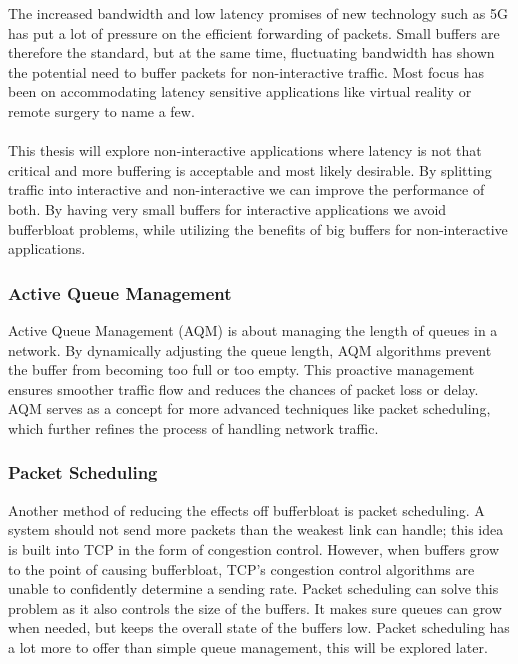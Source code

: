 \documentclass[a4paper,english, 11pt]{report}
\begin{document}
The increased bandwidth and low latency promises of new technology such as 5G has put a lot of pressure on the efficient forwarding of packets. Small buffers are therefore the standard, but at the same time, fluctuating bandwidth has shown the potential need to buffer packets for non-interactive traffic.
Most focus has been on accommodating latency sensitive applications like virtual reality or remote surgery to name a few.\\\\
This thesis will explore non-interactive applications where latency is not that critical and more buffering is acceptable and most likely desirable. By splitting traffic into interactive and non-interactive we can improve the performance of both. By having very small buffers for interactive applications we avoid bufferbloat problems, while utilizing the benefits of big buffers for non-interactive applications.\\

\subsubsection{Active Queue Management}
Active Queue Management (AQM) is about managing the length of queues in a network. By dynamically adjusting the queue length, AQM algorithms\cite{aqm_survey} prevent the buffer from becoming too full or too empty\cite{aqm}. This proactive management ensures smoother traffic flow and reduces the chances of packet loss or delay. AQM serves as a concept for more advanced techniques like packet scheduling, which further refines the process of handling network traffic.

\subsubsection{Packet Scheduling}
Another method of reducing the effects off bufferbloat is packet scheduling. A system should not send more packets than the weakest link can handle; this idea is built into TCP in the form of congestion control. However, when buffers grow to the point of causing bufferbloat, TCP's congestion control algorithms are unable to confidently determine a sending rate. Packet scheduling can solve this problem as it also controls the size of the buffers. It makes sure queues can grow when needed, but keeps the overall state of the buffers low. Packet scheduling has a lot more to offer than simple queue management, this will be explored later.\\
\end{document}
